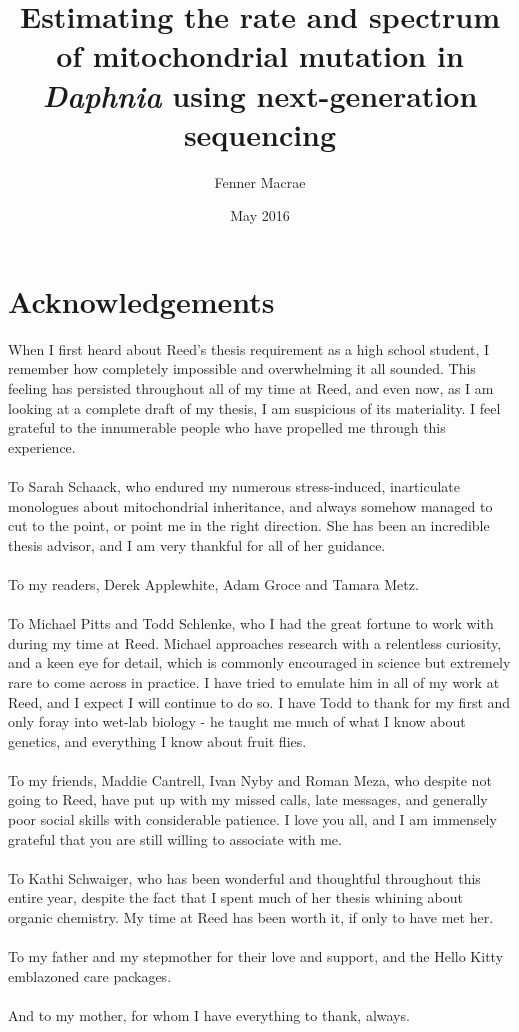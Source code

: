 \documentclass[12pt,twoside]{reedthesis}
\title{Estimating the rate and spectrum of mitochondrial mutation in \textit{Daphnia} using next-generation sequencing}
\author{Fenner Macrae}
\date{May 2016}
\begin{document}
\maketitle
\frontmatter 
\pagestyle{empty} %

\chapter*{Acknowledgements}	
When I first heard about Reed's thesis requirement as a high school student, I remember how completely impossible and overwhelming it all sounded.
This feeling has persisted throughout all of my time at Reed, and even now, as I am looking at a complete draft of my thesis, I am suspicious of its materiality.
I feel grateful to the innumerable people who have propelled me through this experience.
\\ \\
To Sarah Schaack, who endured my numerous stress-induced, inarticulate monologues about mitochondrial inheritance, and always somehow managed to cut to the point, or point me in the right direction. 
She has been an incredible thesis advisor, and I am very thankful for all of her guidance.
\\ \\
To my readers, Derek Applewhite, Adam Groce and Tamara Metz.
\\ \\
To Michael Pitts and Todd Schlenke, who I had the great fortune to work with during my time at Reed. 
Michael approaches research with a relentless curiosity, and a keen eye for detail, which is commonly encouraged in science but extremely rare to come across in practice.
I have tried to emulate him in all of my work at Reed, and I expect I will continue to do so.
I have Todd to thank for my first and only foray into wet-lab biology - he taught me much of what I know about genetics, and everything I know about fruit flies.
\\ \\
To my friends, Maddie Cantrell, Ivan Nyby and Roman Meza, who despite not going to Reed, have put up with my missed calls, late messages, and generally poor social skills with considerable patience.
I love you all, and I am immensely grateful that you are still willing to associate with me.
\\ \\
To Kathi Schwaiger, who has been wonderful and thoughtful throughout this entire year, despite the fact that I spent much of her thesis whining about organic chemistry.
My time at Reed has been worth it, if only to have met her.
\\ \\
To my father and my stepmother for their love and support, and the Hello Kitty emblazoned care packages.
\\ \\
And to my mother, for whom I have everything to thank, always. 
\end{document}
